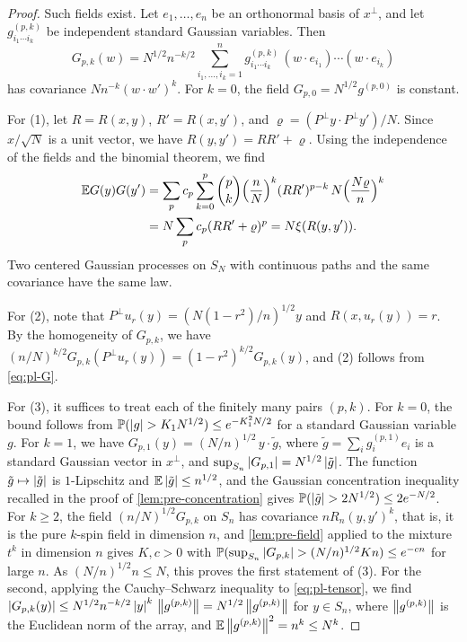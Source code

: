 \begin{proof}
Such fields exist. Let $e_1,\dots,e_n$ be an orthonormal basis of $x^\perp$, and let $g^{(p,k)}_{i_1\cdots i_k}$ be independent standard Gaussian variables. Then
\begin{equation}\label{eq:pl-tensor}
G_{p,k}(w)=N^{1/2}n^{-k/2}\sum_{i_1,\dots,i_k=1}^ng^{(p,k)}_{i_1\cdots i_k}\,(w\cdot e_{i_1})\cdots(w\cdot e_{i_k})
\end{equation}
has covariance $Nn^{-k}(w\cdot w')^k$. For $k=0$, the field $G_{p,0}=N^{1/2}g^{(p,0)}$ is constant.

For (1), let $R=R(x,y)$, $R'=R(x,y')$, and $\varrho=(P^\perp y\cdot P^\perp y')/N$. Since $x/\sqrt N$ is a unit vector, we have $R(y,y')=RR'+\varrho$. Using the independence of the fields and the binomial theorem, we find
\[
\begin{aligned}
\mathbb E G(y)G(y')&=\sum_pc_p\sum_{k=0}^p\binom pk\Bigl(\frac nN\Bigr)^k(RR')^{p-k}\,N\Bigl(\frac{N\varrho}n\Bigr)^k\\
&=N\sum_pc_p(RR'+\varrho)^p=N\xi(R(y,y')).
\end{aligned}
\]
Two centered Gaussian processes on $S_N$ with continuous paths and the same covariance have the same law.

For (2), note that $P^\perp u_r(y)=(N(1-r^2)/n)^{1/2}y$ and $R(x,u_r(y))=r$. By the homogeneity of $G_{p,k}$, we have $(n/N)^{k/2}G_{p,k}(P^\perp u_r(y))=(1-r^2)^{k/2}G_{p,k}(y)$, and (2) follows from \eqref{eq:pl-G}.

For (3), it suffices to treat each of the finitely many pairs $(p,k)$. For $k=0$, the bound follows from $\Pp(\abs g>K_1N^{1/2})\le e^{-K_1^2N/2}$ for a standard Gaussian variable $g$. For $k=1$, we have $G_{p,1}(y)=(N/n)^{1/2}\,y\cdot\tilde g$, where $\tilde g=\sum_ig^{(p,1)}_ie_i$ is a standard Gaussian vector in $x^\perp$, and $\sup_{S_n}\left|G_{p,1}\right|=N^{1/2}\left|\tilde g\right|$. The function $\tilde g\mapsto\left|\tilde g\right|$ is $1$-Lipschitz and $\mathbb E\left|\tilde g\right|\le n^{1/2}$, and the Gaussian concentration inequality recalled in the proof of \cref{lem:pre-concentration} gives $\Pp(\abs{\tilde g}>2N^{1/2})\le2e^{-N/2}$. For $k\ge2$, the field $(n/N)^{1/2}G_{p,k}$ on $S_n$ has covariance $nR_n(y,y')^k$, that is, it is the pure $k$-spin field in dimension $n$, and \cref{lem:pre-field} applied to the mixture $t^k$ in dimension $n$ gives $K,c>0$ with $\Pp(\sup_{S_n}\abs{G_{p,k}}>(N/n)^{1/2}Kn)\le e^{-cn}$ for large $n$. As $(N/n)^{1/2}n\le N$, this proves the first statement of (3). For the second, applying the Cauchy--Schwarz inequality to \eqref{eq:pl-tensor}, we find $\left|G_{p,k}(y)\right|\le N^{1/2}n^{-k/2}\left|y\right|^k\,\left\lVert g^{(p,k)}\right\rVert=N^{1/2}\left\lVert g^{(p,k)}\right\rVert$ for $y\in S_n$, where $\left\lVert g^{(p,k)}\right\rVert$ is the Euclidean norm of the array, and $\mathbb E\left\lVert g^{(p,k)}\right\rVert^2=n^k\le N^k$.
\end{proof}

